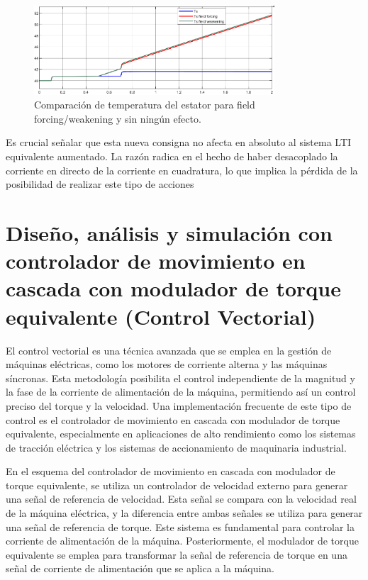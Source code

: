 \documentclass{article}
\begin{document}
\begin{figure}[H]
    \centering
    \includegraphics[width=0.8\textwidth]{5.1.6_d7.png}
    \caption{Comparación de temperatura del estator para field forcing/weakening y sin ningún efecto.}
\end{figure}

Es crucial señalar que esta nueva consigna no afecta en absoluto al sistema LTI equivalente aumentado. 
La razón radica en el hecho de haber desacoplado la corriente en directo de la corriente en 
cuadratura, lo que implica la pérdida de la posibilidad de realizar este tipo de acciones

\newpage



\section{Diseño, análisis y simulación con controlador de movimiento en cascada con modulador de torque equivalente (Control Vectorial)}

El control vectorial es una técnica avanzada que se emplea en la gestión de máquinas eléctricas, como 
los motores de corriente alterna y las máquinas síncronas. Esta metodología posibilita el control 
independiente de la magnitud y la fase de la corriente de alimentación de la máquina, permitiendo así 
un control preciso del torque y la velocidad. Una implementación frecuente de este tipo de control es 
el controlador de movimiento en cascada con modulador de torque equivalente, especialmente en aplicaciones 
de alto rendimiento como los sistemas de tracción eléctrica y los sistemas de accionamiento de maquinaria 
industrial.

En el esquema del controlador de movimiento en cascada con modulador de torque equivalente, se utiliza 
un controlador de velocidad externo para generar una señal de referencia de velocidad. Esta señal se 
compara con la velocidad real de la máquina eléctrica, y la diferencia entre ambas señales se utiliza 
para generar una señal de referencia de torque. Este sistema es fundamental para controlar la corriente 
de alimentación de la máquina. Posteriormente, el modulador de torque equivalente se emplea para 
transformar la señal de referencia de torque en una señal de corriente de alimentación que se aplica 
a la máquina.
\end{document}
